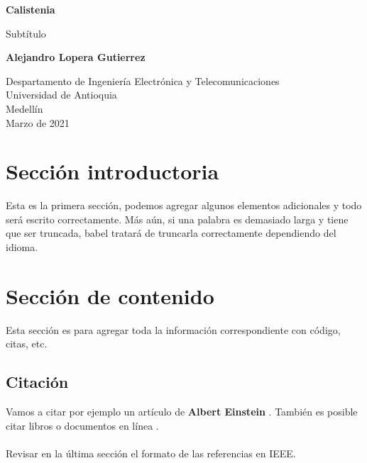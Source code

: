 \documentclass{article}
\begin{document}
\begin{titlepage}
    \begin{center}
        \vspace*{1cm}
            
        \Huge
        \textbf{Calistenia}
            
        \vspace{0.5cm}
        \LARGE
        Subtítulo
            
        \vspace{1.5cm}
            
        \textbf{Alejandro Lopera Gutierrez}
            
        \vfill
            
        \vspace{0.8cm}
            
        \Large
        Despartamento de Ingeniería Electrónica y Telecomunicaciones\\
        Universidad de Antioquia\\
        Medellín\\
        Marzo de 2021
            
    \end{center}
\end{titlepage}

\tableofcontents
\newpage
\section{Sección introductoria}\label{intro}
Esta es la primera sección, podemos agregar algunos elementos adicionales y todo será escrito correctamente. Más aún, si una palabra es demasiado larga y tiene que ser truncada, babel tratará de truncarla correctamente dependiendo del idioma.

\section{Sección de contenido} \label{contenido}
Esta sección es para agregar toda la información correspondiente con código, citas, etc.
\subsection{Citación}
Vamos a citar por ejemplo un artículo de \textbf{Albert Einstein} \cite{einstein}.
También es posible citar libros \cite{dirac} o documentos en línea \cite{knuthwebsite}.\\\\
Revisar en la última sección el formato de las referencias en IEEE.
\end{document}
